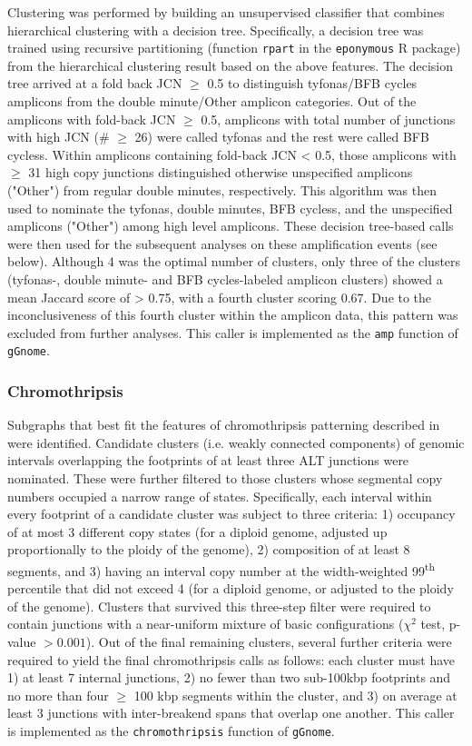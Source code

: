 \documentclass[phd,tocprelim]{cornell}
\newcommand{\ttt}[1]{\texttt{#1}}
\begin{document}
Clustering was performed by building an unsupervised classifier that combines hierarchical clustering with a decision tree.  Specifically, a decision tree was trained using recursive partitioning (function \texttt{rpart} in the \texttt{eponymous} R package) from the hierarchical clustering result based on the above features. The decision tree arrived at a fold back JCN $\ge$ 0.5 to distinguish tyfonas/BFB cycles amplicons from the double minute/Other amplicon categories. Out of the amplicons with fold-back JCN $\geq$ 0.5, amplicons with total number of junctions with high JCN (\# $\geq$ 26) were called tyfonas and the rest were called BFB cycless. Within amplicons containing fold-back JCN < 0.5, those amplicons with $\geq$ 31 high copy junctions distinguished otherwise unspecified amplicons ("Other") from regular double minutes, respectively. This algorithm was then used to nominate the tyfonas, double minutes, BFB cycless, and the unspecified amplicons ("Other") among high level amplicons. These decision tree-based calls were then used for the subsequent analyses on these amplification events (see below). Although 4 was the optimal number of clusters, only three of the clusters (tyfonas-, double minute- and BFB cycles-labeled amplicon clusters) showed a mean Jaccard score of > 0.75, with a fourth cluster scoring 0.67. Due to the inconclusiveness of this fourth cluster within the amplicon data, this pattern was excluded from further analyses. This caller is implemented as the \ttt{amp} function of \ttt{gGnome}.



\subsubsection*{Chromothripsis}

Subgraphs that best fit the features of chromothripsis patterning described in \cite{korbel2013} were identified. Candidate clusters (i.e. weakly connected components) of genomic intervals overlapping the footprints of at least three ALT junctions were nominated.  These were further filtered to those clusters whose segmental copy numbers occupied a narrow range of states. Specifically, each interval within every footprint of a candidate cluster was subject to three criteria: 1) occupancy of at most 3 different copy states (for a diploid genome, adjusted up proportionally to the ploidy of the genome), 2) composition of at least 8 segments, and 3) having an interval copy number at the width-weighted 99\textsuperscript{th} percentile that did not exceed 4 (for a diploid genome, or adjusted to the ploidy of the genome). Clusters that survived this three-step filter were required to contain junctions with a near-uniform mixture of basic configurations ($\chi^2$ test, p-value $> 0.001$). Out of the final remaining clusters, several further criteria were required to yield the final chromothripsis calls as follows: each cluster must have 1) at least 7 internal junctions, 2) no fewer than two sub-100kbp footprints and no more than four $\geq$ 100 kbp segments within the cluster, and 3) on average at least 3 junctions with inter-breakend spans that overlap one another. This caller is implemented as the \ttt{chromothripsis} function of \ttt{gGnome}.
\end{document}
